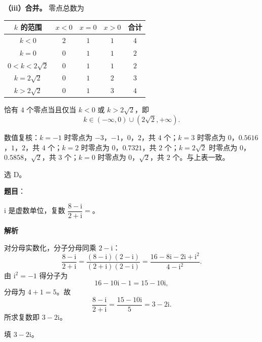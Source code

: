 \begin{answer}
\textbf{（iii）合并。} 零点总数为

\begin{center}
\begin{tabular}{ccccc}
\toprule
$k$ 的范围 & $x<0$ & $x=0$ & $x>0$ & 合计 \\
\midrule
$k<0$ & $2$ & $1$ & $1$ & $4$ \\
$k=0$ & $0$ & $1$ & $1$ & $2$ \\
$0<k<2\sqrt2$ & $0$ & $1$ & $1$ & $2$ \\
$k=2\sqrt2$ & $0$ & $1$ & $2$ & $3$ \\
$k>2\sqrt2$ & $0$ & $1$ & $3$ & $4$ \\
\bottomrule
\end{tabular}
\end{center}

恰有 $4$ 个零点当且仅当 $k<0$ 或 $k>2\sqrt2$，即
\nopagebreak[4]
\[k\in(-\infty,0)\cup(2\sqrt2,+\infty).\]

数值复核：$k=-1$ 时零点为 $-3$，$-1$，$0$，$2$，共 $4$ 个；$k=3$ 时零点为 $0$，$0.5616$，$1$，$2$，共 $4$ 个；$k=2$ 时零点为 $0$，$0.7321$，共 $2$ 个；$k=2\sqrt2$ 时零点为 $0$，$0.5858$，$\sqrt2$，共 $3$ 个；$k=0$ 时零点为 $0$，$\sqrt2$，共 $2$ 个。与上表一致。

选 D。


\end{answer}
\begin{answer}

\textbf{题目}：

$\mathrm i$ 是虚数单位，复数 $\dfrac{8-\mathrm i}{2+\mathrm i}=$\gkblank{}。

\textbf{解析}

对分母实数化，分子分母同乘 $2-\mathrm i$：
\nopagebreak[4]
\[\frac{8-\mathrm i}{2+\mathrm i}=\frac{(8-\mathrm i)(2-\mathrm i)}{(2+\mathrm i)(2-\mathrm i)}=\frac{16-8\mathrm i-2\mathrm i+\mathrm i^2}{4-\mathrm i^2}.\]
由 $\mathrm i^2=-1$ 得分子为
\nopagebreak[4]
\[16-10\mathrm i-1=15-10\mathrm i,\]
分母为 $4+1=5$。故
\nopagebreak[4]
\[\frac{8-\mathrm i}{2+\mathrm i}=\frac{15-10\mathrm i}5=3-2\mathrm i .\]
所求复数即 $3-2\mathrm i$。

填 $3-2\mathrm i$。


\end{answer}
